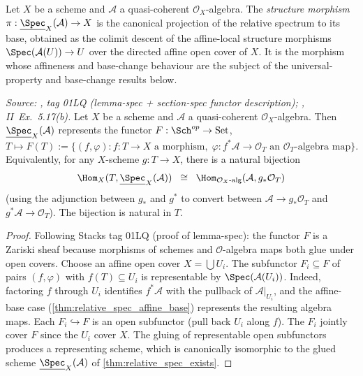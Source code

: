 \begin{definition}
  \leanok
  \label{def:relspec_structure_morphism}
  Let \(X\) be a scheme and \(\mathcal{A}\) a quasi-coherent \(\mathcal{O}_X\)-algebra.
  The \emph{structure morphism}
  \(\pi : \underline{\Spec}_X(\mathcal{A}) \to X\) is the canonical projection of the
  relative spectrum to its base, obtained as the colimit descent of the affine-local
  structure morphisms \(\Spec(\mathcal{A}(U)) \to U\) over the directed affine open
  cover of \(X\). It is the morphism whose affineness and base-change behaviour are the
  subject of the universal-property and base-change results below.
\end{definition}

\begin{theorem}
  \label{thm:relative_spec_univ}
  \textit{Source: \cite{stacks-project}, tag 01LQ (lemma-spec + section-spec
  functor description); \cite{hartshorne-ag}, II~Ex.~5.17(b).}
  Let \(X\) be a scheme and \(\mathcal{A}\) a quasi-coherent \(\mathcal{O}_X\)-algebra.
  Then \(\underline{\Spec}_X(\mathcal{A})\) represents the functor
  \(F : \Sch^{op} \to \mathrm{Set}\),
  $T \mapsto F(T) := \{(f, \varphi) : f : T \to X \text{ a morphism},\;
  \varphi : f^* \mathcal{A} \to \mathcal{O}_T \text{ an } \mathcal{O}_T\text{-algebra map}\}.$
  Equivalently, for any \(X\)-scheme \(g : T \to X\),
  there is a natural bijection
  \[
    \Hom_X(T, \underline{\Spec}_X(\mathcal{A})) \;\;\cong\;\;
    \Hom_{\mathcal{O}_X\text{-alg}}(\mathcal{A}, g_* \mathcal{O}_T)
  \]
  (using the adjunction between \(g_*\) and \(g^*\) to convert between
  \(\mathcal{A} \to g_*\mathcal{O}_T\) and \(g^*\mathcal{A} \to \mathcal{O}_T\)).
  The bijection is natural in \(T\).
\end{theorem}

\begin{proof}
  Following Stacks tag 01LQ (proof of lemma-spec): the functor \(F\) is a Zariski sheaf
  because morphisms of schemes and \(\mathcal{O}\)-algebra maps both glue under open covers.
  Choose an affine open cover \(X = \bigcup U_i\). The subfunctor
  \(F_i \subseteq F\) of pairs \((f, \varphi)\) with \(f(T) \subseteq U_i\) is representable by
  \(\Spec(\mathcal{A}(U_i))\). Indeed, factoring \(f\) through \(U_i\) identifies
  \(f^*\mathcal{A}\) with the pullback of \(\mathcal{A}|_{U_i}\), and the affine-base
  case (\cref{thm:relative_spec_affine_base}) represents the resulting algebra maps.
  Each \(F_i \hookrightarrow F\) is an open
  subfunctor (pull back \(U_i\) along \(f\)). The \(F_i\) jointly cover \(F\) since the \(U_i\)
  cover \(X\). The gluing of representable open subfunctors produces a representing scheme,
  which is canonically isomorphic to the glued scheme \(\underline{\Spec}_X(\mathcal{A})\)
  of \cref{thm:relative_spec_exists}.
\end{proof}

